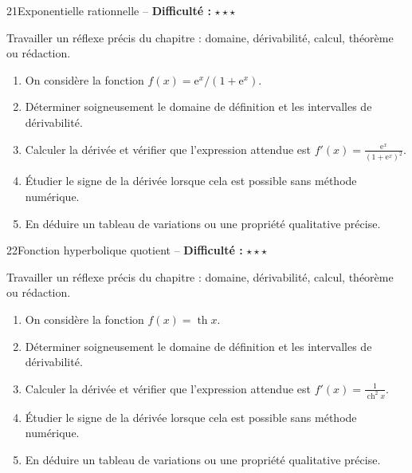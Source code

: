 \documentclass[11pt,a4paper]{article}
\newcommand{\e}{\mathrm{e}}
\newcommand{\ch}{\operatorname{ch}}
\newcommand{\thh}{\operatorname{th}}
\newcommand{\etoiles}[1]{\textbf{Difficulté :} #1}
\begin{document}
\begin{exobox}{21}{Exponentielle rationnelle -- \etoiles{$\star\star\star$}}

\begin{objectifbox}
Travailler un réflexe précis du chapitre : domaine, dérivabilité, calcul, théorème ou rédaction.
\end{objectifbox}

\begin{enumerate}

\item On considère la fonction $f(x)=\e^{x}/(1+\e^{x})$.

\item Déterminer soigneusement le domaine de définition et les intervalles de dérivabilité.

\item Calculer la dérivée et vérifier que l'expression attendue est $f'(x)=\frac{\e^x}{(1+\e^x)^2}$.

\item Étudier le signe de la dérivée lorsque cela est possible sans méthode numérique.

\item En déduire un tableau de variations ou une propriété qualitative précise.

\end{enumerate}

\end{exobox}


\begin{exobox}{22}{Fonction hyperbolique quotient -- \etoiles{$\star\star\star$}}

\begin{objectifbox}
Travailler un réflexe précis du chapitre : domaine, dérivabilité, calcul, théorème ou rédaction.
\end{objectifbox}

\begin{enumerate}

\item On considère la fonction $f(x)=\thh x$.

\item Déterminer soigneusement le domaine de définition et les intervalles de dérivabilité.

\item Calculer la dérivée et vérifier que l'expression attendue est $f'(x)=\frac{1}{\ch^2x}$.

\item Étudier le signe de la dérivée lorsque cela est possible sans méthode numérique.

\item En déduire un tableau de variations ou une propriété qualitative précise.

\end{enumerate}

\end{exobox}
\end{document}
